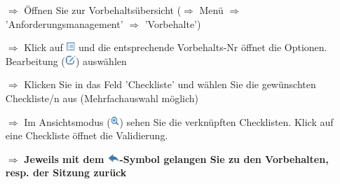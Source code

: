 \documentclass{article}
\begin{document}
\begin{multicols}{2}
\begin{tcolorbox}[colback=blue!5,colframe=blue!40!black,title=Einbindung der Checklisten bei Vorbehalten]
\begin{itemize}
  \item[$\Longrightarrow$] Öffnen Sie zur Vorbehaltsübersicht ($\Rightarrow$ Menü $\Rightarrow$ 'Anforderungsmanagement' $\Rightarrow$ 'Vorbehalte')
  \item[$\Longrightarrow$] Klick auf \includegraphics[height=10pt]{Icons/Listensymbol.png} und die entsprechende Vorbehalts-Nr öffnet die Optionen. Bearbeitung (\includegraphics[height=10pt]{Icons/Bearbeiten.png}) auswählen
  \item[$\Longrightarrow$] Klicken Sie in das Feld 'Checkliste' und wählen Sie die gewünschten Checkliste/n aus (Mehrfachauswahl möglich)
  \item[$\Longrightarrow$] Im Ansichtsmodus (\includegraphics[height=10pt]{Icons/Lupe.png})	sehen Sie die verknüpften Checklisten. Klick auf eine Checkliste öffnet die Validierung.
\vspace{\baselineskip}
  \item[$\Longrightarrow$] \textbf{Jeweils mit dem \includegraphics[height=10pt]{Icons/Pfeil_l.png}-Symbol gelangen Sie zu den Vorbehalten, resp. der Sitzung zurück}
\end{itemize}
\end{tcolorbox}


\end{multicols}


\pagebreak
{}

\vspace{\baselineskip}
\end{document}
